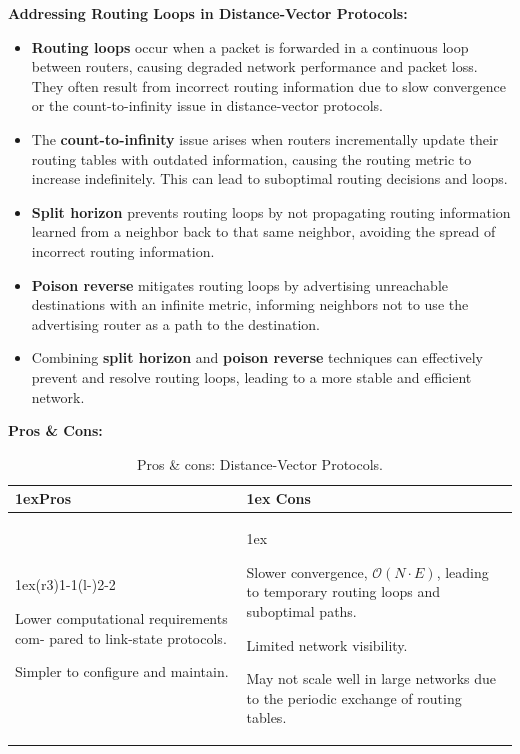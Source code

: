 \vspace{1em}
\noindent \textbf{Addressing Routing Loops in Distance-Vector Protocols:}
\begin{itemize}
    \item \textbf{Routing loops} occur when a packet is forwarded in a continuous loop between routers, causing degraded network performance and packet loss. They often result from incorrect routing information due to slow convergence or the count-to-infinity issue in distance-vector protocols.

    \item The \textbf{count-to-infinity} issue arises when routers incrementally update their routing tables with outdated information, causing the routing metric to increase indefinitely. This can lead to suboptimal routing decisions and loops.
    
    \item \textbf{Split horizon} prevents routing loops by not propagating routing information learned from a neighbor back to that same neighbor, avoiding the spread of incorrect routing information.
    
    \item \textbf{Poison reverse} mitigates routing loops by advertising unreachable destinations with an infinite metric, informing neighbors not to use the advertising router as a path to the destination.
    
    \item Combining \textbf{split horizon} and \textbf{poison reverse} techniques can effectively prevent and resolve routing loops, leading to a more stable and efficient network.
\end{itemize}

\newpage
\noindent \textbf{Pros \& Cons:}
\begin{table}[H]
    \begin{tabularx}{\linewidth}{>{\parskip1ex}X@{\kern4\tabcolsep}>{\parskip1ex}X}
    \toprule
    \hfil\bfseries Pros
    &
    \hfil\bfseries Cons 
    \\\cmidrule(r{3\tabcolsep}){1-1}\cmidrule(l{-\tabcolsep}){2-2}
    
    Lower computational requirements com- pared to link-state protocols.\par
    Simpler to configure and maintain.
    &
    
    Slower convergence, $\mathcal{O}(N \cdot E)$, leading to temporary routing loops and suboptimal paths.\par
    Limited network visibility.\par
    May not scale well in large networks due to the periodic exchange of routing tables.
    \\\bottomrule
    \end{tabularx}
    \caption{Pros \& cons: Distance-Vector Protocols.}
\end{table}

